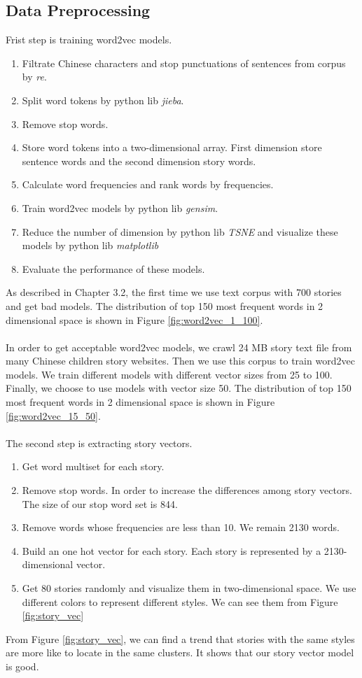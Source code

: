 \documentclass[sigconf]{acmart}
\begin{document}
\subsection{Data Preprocessing}
Frist step is training word2vec models.
\begin{enumerate}
\item Filtrate Chinese characters and stop punctuations of sentences from corpus by \emph{re}.
\item Split word tokens by python lib \emph{jieba}.
\item Remove stop words.
\item Store word tokens into a two-dimensional array. First dimension store sentence words and the second dimension story words.
\item Calculate word frequencies and rank words by frequencies.
\item Train word2vec models by python lib \emph{gensim}.
\item Reduce the number of dimension by python lib \emph{TSNE} and visualize these models by python lib \emph{matplotlib}
\item Evaluate the performance of these models.
\end{enumerate}
As described in Chapter 3.2, the first time we use text corpus with 700 stories and get bad models. The distribution of top 150 most frequent words in 2 dimensional space is shown in Figure \ref{fig:word2vec_1_100}.
\\\\
In order to get acceptable word2vec models, we crawl 24 MB story text file from many Chinese children story websites. Then we use this corpus to train word2vec models. We train different models with different vector sizes from 25 to 100. Finally, we choose to use models with vector size 50. The distribution of top 150 most frequent words in 2 dimensional space is shown in Figure \ref{fig:word2vec_15_50}. 
\\\\
The second step is extracting story vectors.
\begin{enumerate}
\item Get word multiset for each story.
\item Remove stop words. In order to increase the differences among story vectors. The size of our stop word set is 844.
\item Remove words whose frequencies are less than 10. We remain 2130 words.
\item Build an one hot vector for each story. Each story is represented by a 2130-dimensional vector.
\item Get 80 stories randomly and visualize them in two-dimensional space. We use different colors to represent different styles. We can see them from Figure \ref{fig:story_vec}
\end{enumerate}
From Figure \ref{fig:story_vec}, we can find a trend that stories with the same styles are more like to locate in the same clusters. It shows that our story vector model is good.
\end{document}

